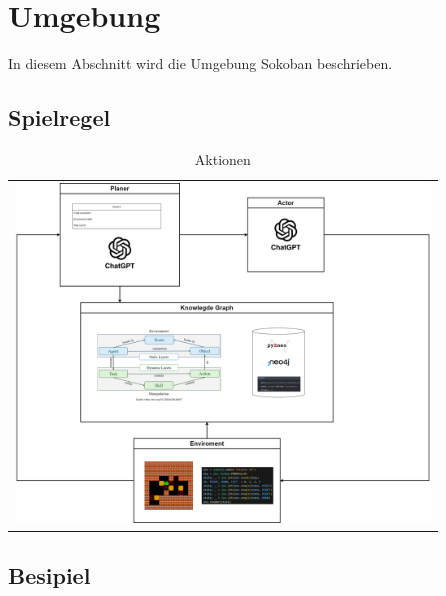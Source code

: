 \section{Umgebung}
\label{Sec:Umgebung}

In diesem Abschnitt wird die Umgebung Sokoban beschrieben.~\cite{schrader_gym-sokoban_2018}

\subsection{Spielregel}
\label{Subsec:Spielregel}

\begin{table}[htb!]
	\centering
	\caption[Aktionen]{Aktionen}
	\vspace{2mm}
	\begin{tabular}{c}
	\includegraphics[width=11cm]{images/CodeGenKgArchitecture.png}
	\end{tabular}
	\label{Tab:Aktionen}	
\end{table}

\subsection{Besipiel}
\label{Subsec:Besipiel}
